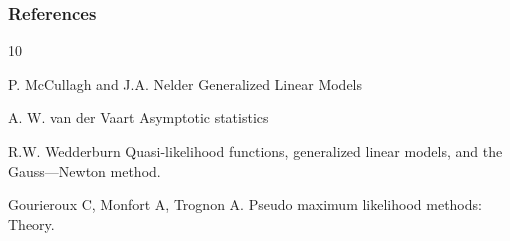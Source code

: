 \documentclass{beamer}
\begin{document}
\begin{frame}[allowframebreaks]
  \frametitle{References}    
  \begin{thebibliography}{10}    


    

    

       \beamertemplatearticlebibitems
 P. McCullagh and J.A. Nelder
    \newblock  Generalized Linear Models

      \beamertemplatearticlebibitems
 A. W. van der Vaart
    \newblock  Asymptotic statistics
       
       \beamertemplatearticlebibitems
R.W. Wedderburn
    \newblock  Quasi-likelihood functions, generalized linear models, and the Gauss—Newton method.
    
    
           \beamertemplatearticlebibitems
Gourieroux C, Monfort A, Trognon A.
    \newblock  Pseudo maximum likelihood methods: Theory.
    
  \end{thebibliography}
\end{frame}
\end{document}
